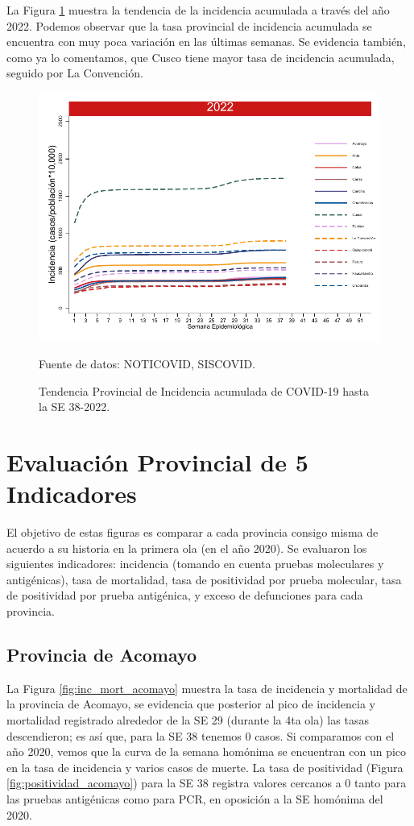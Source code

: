 \documentclass[12pt,a4paper,openany]{book}
\begin{document}
	La Figura \ref{fig:incidencia_provincial} muestra la tendencia de la incidencia acumulada a través del año 2022. Podemos observar que la tasa provincial de incidencia acumulada se encuentra con muy poca variación en las últimas semanas. Se evidencia también, como ya lo comentamos, que Cusco tiene mayor tasa de incidencia acumulada, seguido por La Convención.
	
	\begin{figure}[h]
		\caption{Tendencia Provincial de Incidencia acumulada de COVID-19 hasta la SE 38-2022. }\label{fig:incidencia_provincial}
		\begin{center}
			\includegraphics[width=0.60\linewidth]{../figuras/incidencia_provincial_acumulada_2022.pdf}
		\end{center}
		{\footnotesize {Fuente de datos: NOTICOVID, SISCOVID.}}
	\end{figure}
	
	\clearpage
	
	\section*{Evaluación Provincial de 5 Indicadores}
	\noindent El objetivo de estas figuras es comparar a cada provincia consigo misma de acuerdo a su historia  en la primera ola (en el año 2020). Se evaluaron los siguientes indicadores: incidencia (tomando en cuenta pruebas moleculares y antigénicas), tasa de mortalidad, tasa de positividad por prueba molecular, tasa de positividad por prueba antigénica, y exceso de defunciones para cada provincia.
	
	\subsection*{Provincia de Acomayo}
	\noindent La Figura \ref{fig:inc_mort_acomayo} muestra la tasa de incidencia y mortalidad de la provincia de Acomayo, se evidencia que posterior al pico de incidencia y mortalidad registrado alrededor de la SE 29 (durante la 4ta ola) las tasas descendieron; es así que, para la SE 38 tenemos 0 casos. Si comparamos con el año 2020, vemos que la curva de la semana homónima se encuentran con un pico en la tasa de incidencia y varios casos de muerte. La tasa de positividad (Figura \ref{fig:positividad_acomayo}) para la SE 38 registra valores cercanos a 0 tanto para las pruebas antigénicas como para PCR, en oposición a la SE homónima del 2020.
		
\end{document}
